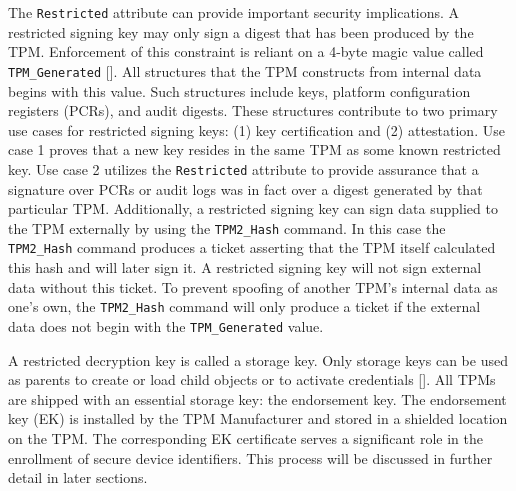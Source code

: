 The \verb|Restricted| attribute can provide important security implications. A restricted signing key may only sign a digest that has been produced by the TPM. Enforcement of this constraint is reliant on a 4-byte magic value called \verb|TPM_Generated| [\cite{TPMSpec}]. All structures that the TPM constructs from internal data begins with this value. Such structures include keys, platform configuration registers (PCRs), and audit digests. These structures contribute to two primary use cases for restricted signing keys: (1) key certification and (2) attestation. Use case 1 proves that a new key resides in the same TPM as some known restricted key. Use case 2 utilizes the \verb|Restricted| attribute to provide assurance that a signature over PCRs or audit logs was in fact over a digest generated by that particular TPM. Additionally, a restricted signing key can sign data supplied to the TPM externally by using the \verb|TPM2_Hash| command. In this case the \verb|TPM2_Hash| command produces a ticket asserting that the TPM itself calculated this hash and will later sign it. A restricted signing key will not sign external data without this ticket. To prevent spoofing of another TPM's internal data as one's own, the \verb|TPM2_Hash| command will only produce a ticket if the external data does not begin with the \verb|TPM_Generated| value.

A restricted decryption key is called a storage key. Only storage keys can be used as parents to create or load child objects or to activate credentials [\cite{PracticalGuide}]. All TPMs are shipped with an essential storage key: the endorsement key. The endorsement key (EK) is installed by the TPM Manufacturer and stored in a shielded location on the TPM. The corresponding EK certificate serves a significant role in the enrollment of secure device identifiers. This process will be discussed in further detail in later sections.







